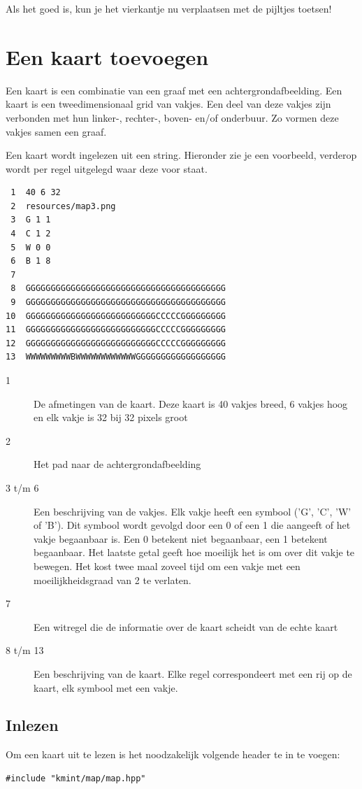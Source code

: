 \documentclass[11pt]{article}
\begin{document}
Als het goed is, kun je het vierkantje nu verplaatsen met de pijltjes toetsen!

\section{Een kaart toevoegen}
\label{sec:org88e17dd}

Een kaart is een combinatie van een graaf met een achtergrondafbeelding. Een kaart
is een tweedimensionaal grid van vakjes. Een deel van deze vakjes zijn
verbonden met hun linker-, rechter-, boven- en/of onderbuur. Zo vormen deze
vakjes samen een graaf.

Een kaart wordt ingelezen uit een string. Hieronder zie je een voorbeeld,
verderop wordt per regel uitgelegd waar deze voor staat.
\begin{verbatim}
 1  40 6 32
 2  resources/map3.png
 3  G 1 1
 4  C 1 2
 5  W 0 0
 6  B 1 8
 7  
 8  GGGGGGGGGGGGGGGGGGGGGGGGGGGGGGGGGGGGGGGG
 9  GGGGGGGGGGGGGGGGGGGGGGGGGGGGGGGGGGGGGGGG
10  GGGGGGGGGGGGGGGGGGGGGGGGGGCCCCCGGGGGGGGG
11  GGGGGGGGGGGGGGGGGGGGGGGGGGCCCCCGGGGGGGGG
12  GGGGGGGGGGGGGGGGGGGGGGGGGGCCCCCGGGGGGGGG
13  WWWWWWWWWBWWWWWWWWWWWWGGGGGGGGGGGGGGGGGG
\end{verbatim}

\begin{description}
\item[{1}] De afmetingen van de kaart. Deze kaart is 40 vakjes breed, 6 vakjes
hoog en elk vakje is 32 bij 32 pixels groot
\item[{2}] Het pad naar de achtergrondafbeelding
\item[{3 t/m 6}] Een beschrijving van de vakjes. Elk vakje heeft een symbool
('G', 'C', 'W' of 'B'). Dit symbool wordt gevolgd door een 0 of
een 1 die aangeeft of het vakje begaanbaar is. Een 0 betekent
niet begaanbaar, een 1 betekent begaanbaar. Het laatste getal
geeft hoe moeilijk het is om over dit vakje te bewegen. Het
kost twee maal zoveel tijd om een vakje met een
moeilijkheidsgraad van 2 te verlaten.
\item[{7}] Een witregel die de informatie over de kaart scheidt van de echte kaart
\item[{8 t/m 13}] Een beschrijving van de kaart. Elke regel correspondeert met
een rij op de kaart, elk symbool met een vakje.
\end{description}

\subsection{Inlezen}
\label{sec:org7a56737}
Om een kaart uit te lezen is het noodzakelijk volgende header te in te voegen:
\begin{verbatim}
#include "kmint/map/map.hpp"
\end{verbatim}
\end{document}
